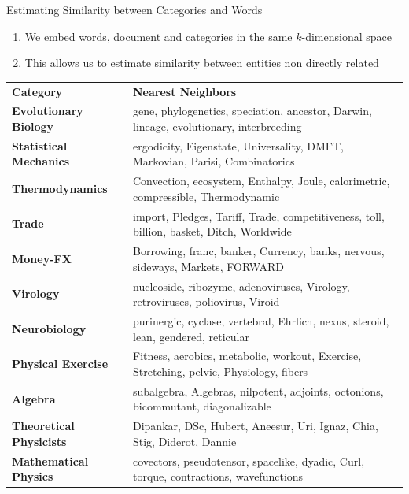 \documentclass[10pt]{beamer}
\begin{document}
\begin{frame}{Estimating Similarity between Categories and Words }
\begin{enumerate}
	\vfill\item We embed words, document and categories in the same $k$-dimensional space
	\vfill\item This allows us to estimate similarity between entities non directly related
\end{enumerate}
\begin{table}[h!]
\tabcolsep=1mm
\scriptsize
\begin{center}
\begin{tabular}{l@{\hskip3mm} l}
\toprule
\multirow{2}{*}{\textbf{Category}} & \multirow{2}{*}{\textbf{Nearest Neighbors}} \\
 & \\
\textbf{Evolutionary Biology}   & gene, phylogenetics, speciation, ancestor, Darwin, lineage, evolutionary, interbreeding \\
\textbf{Statistical Mechanics}  & ergodicity, Eigenstate, Universality, DMFT, Markovian, Parisi, Combinatorics \\
\textbf{Thermodynamics}         & Convection, ecosystem, Enthalpy, Joule, calorimetric, compressible, Thermodynamic \\
\textbf{Trade}                  & import, Pledges, Tariff, Trade, competitiveness, toll, billion, basket, Ditch, Worldwide \\
\textbf{Money-FX}               & Borrowing, franc, banker, Currency, banks, nervous, sideways, Markets, FORWARD \\
\textbf{Virology}               & nucleoside, ribozyme, adenoviruses, Virology, retroviruses, poliovirus, Viroid \\
\textbf{Neurobiology}           & purinergic, cyclase, vertebral, Ehrlich, nexus, steroid, lean, gendered, reticular \\
\textbf{Physical Exercise}      & Fitness, aerobics, metabolic, workout, Exercise, Stretching, pelvic, Physiology, fibers \\
\textbf{Algebra}                & subalgebra, Algebras, nilpotent, adjoints, octonions, bicommutant, diagonalizable \\
\textbf{Theoretical Physicists} & Dipankar, DSc, Hubert, Aneesur, Uri, Ignaz, Chia, Stig, Diderot, Dannie \\
\textbf{Mathematical Physics}   & covectors, pseudotensor, spacelike, dyadic, Curl, torque, contractions, wavefunctions \\

\end{tabular}
\end{center}
\end{table}
\end{frame}
\end{document}
